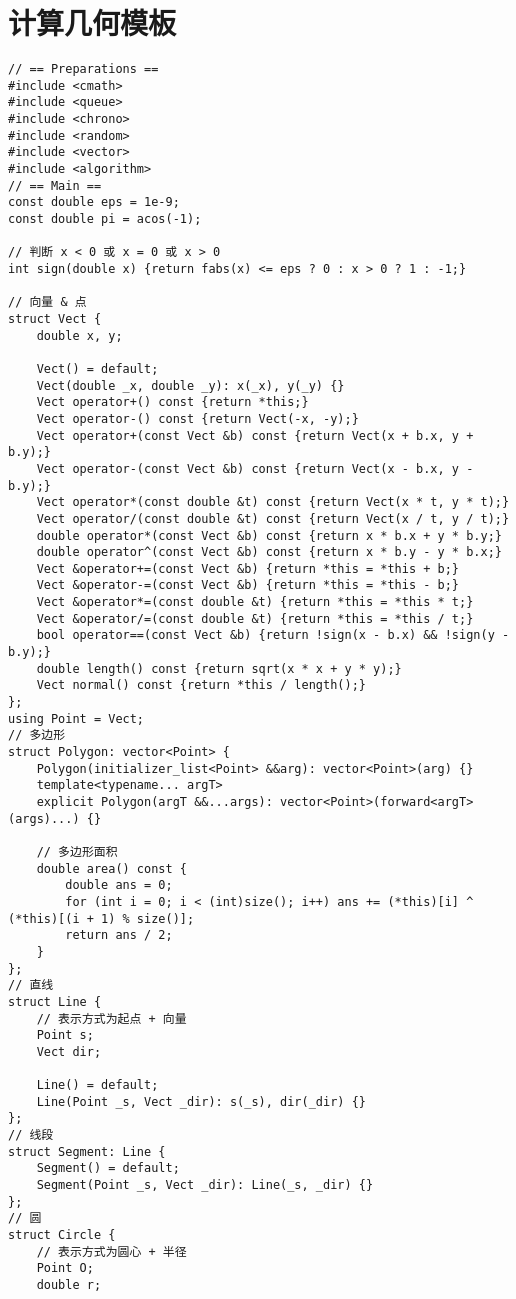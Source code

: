 \section{计算几何模板}

\begin{verbatim}
// == Preparations ==
#include <cmath>
#include <queue>
#include <chrono>
#include <random>
#include <vector>
#include <algorithm>
// == Main ==
const double eps = 1e-9;
const double pi = acos(-1);

// 判断 x < 0 或 x = 0 或 x > 0
int sign(double x) {return fabs(x) <= eps ? 0 : x > 0 ? 1 : -1;}

// 向量 & 点
struct Vect {
    double x, y;

    Vect() = default;
    Vect(double _x, double _y): x(_x), y(_y) {}
    Vect operator+() const {return *this;}
    Vect operator-() const {return Vect(-x, -y);}
    Vect operator+(const Vect &b) const {return Vect(x + b.x, y + b.y);}
    Vect operator-(const Vect &b) const {return Vect(x - b.x, y - b.y);}
    Vect operator*(const double &t) const {return Vect(x * t, y * t);}
    Vect operator/(const double &t) const {return Vect(x / t, y / t);}
    double operator*(const Vect &b) const {return x * b.x + y * b.y;}
    double operator^(const Vect &b) const {return x * b.y - y * b.x;}
    Vect &operator+=(const Vect &b) {return *this = *this + b;}
    Vect &operator-=(const Vect &b) {return *this = *this - b;}
    Vect &operator*=(const double &t) {return *this = *this * t;}
    Vect &operator/=(const double &t) {return *this = *this / t;}
    bool operator==(const Vect &b) {return !sign(x - b.x) && !sign(y - b.y);}
    double length() const {return sqrt(x * x + y * y);}
    Vect normal() const {return *this / length();}
};
using Point = Vect;
// 多边形
struct Polygon: vector<Point> {
    Polygon(initializer_list<Point> &&arg): vector<Point>(arg) {}
    template<typename... argT>
    explicit Polygon(argT &&...args): vector<Point>(forward<argT>(args)...) {}

    // 多边形面积
    double area() const {
        double ans = 0;
        for (int i = 0; i < (int)size(); i++) ans += (*this)[i] ^ (*this)[(i + 1) % size()];
        return ans / 2;
    }
};
// 直线
struct Line {
    // 表示方式为起点 + 向量
    Point s;
    Vect dir;

    Line() = default;
    Line(Point _s, Vect _dir): s(_s), dir(_dir) {}
};
// 线段
struct Segment: Line {
    Segment() = default;
    Segment(Point _s, Vect _dir): Line(_s, _dir) {}
};
// 圆
struct Circle {
    // 表示方式为圆心 + 半径
    Point O;
    double r;


\end{verbatim}

